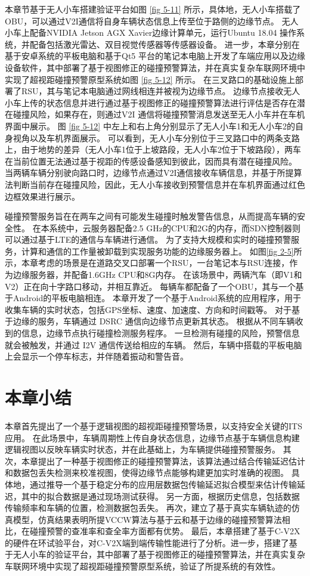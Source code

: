本章节基于无人小车搭建验证平台如图 \ref{fig 5-11} 所示，具体地，无人小车搭载了OBU，可以通过V2I通信将自身车辆状态信息上传至位于路侧的边缘节点。
无人小车上配备NVIDIA Jetson AGX Xavier边缘计算单元，运行Ubuntu 18.04 操作系统，并配备包括激光雷达、双目视觉传感器等传感器设备。
进一步，本章分别在基于安卓系统的平板电脑和基于Qt5 平台的笔记本电脑上开发了车端应用以及边缘设备软件，其中部署了基于视图修正的碰撞预警算法，并在真实复杂车联网环境中实现了超视距碰撞预警原型系统如图 \ref{fig 5-12} 所示。
在三叉路口的基础设施上部署了RSU，其与笔记本电脑通过网线相连并被视为边缘节点。
边缘节点接收无人小车上传的状态信息并进行通过基于视图修正的碰撞预警算法进行评估是否存在潜在碰撞风险，如果存在，则通过V2I 通信将碰撞预警消息发送至无人小车并在车机界面中展示。
图 \ref{fig 5-12} 中左上和右上角分别显示了无人小车1和无人小车2的自身视角以及车机界面展示。
可以看到，无人小车分别位于三叉路口中的两条支路上，由于地势的差异（无人小车1位于上坡路段，无人小车2位于下坡路段），两车在当前位置无法通过基于视距的传感设备感知到彼此，因而具有潜在碰撞风险。
当两辆车辆分别驶向路口时，边缘节点通过V2I通信接收车辆信息，并基于所提算法判断当前存在碰撞风险，因此，无人小车接收到预警信息并在车机界面通过红色边框效果进行展示。

碰撞预警服务旨在在两车之间有可能发生碰撞时触发警告信息，从而提高车辆的安全性。
在本系统中，云服务器配备2.5 GHz的CPU和2G的内存，而SDN控制器则可以通过基于LTE的通信与车辆进行通信。
为了支持大规模和实时的碰撞预警服务，计算和通信的工作量被卸载到实现服务功能的边缘服务器上。
如图\ref{fig 2-5}所示，本章考虑的场景是在道路交叉口部署一个RSU，一台笔记本与RSU连接，作为边缘服务器，并配备1.6GHz CPU和8G内存。
在该场景中，两辆汽车（即V1和V2）正在向十字路口移动，并相互靠近。
每辆车都配备了一个OBU，其与一个基于Android的平板电脑相连。
本章开发了一个基于Android系统的应用程序，用于收集车辆的实时状态，包括GPS坐标、速度、加速度、方向和时间戳等。
对于基于边缘的服务，车辆通过 DSRC 通信向边缘节点更新其状态。
根据从不同车辆收到的信息，边缘节点执行碰撞检测服务程序。
一旦检测有碰撞的风险，预警信息就会被触发，并通过 I2V 通信传送给相应的车辆。
然后，车辆中搭载的平板电脑上会显示一个停车标志，并伴随着振动和警告音。

\section{本章小结}\label{section 5-6}

本章首先提出了一个基于逻辑视图的超视距碰撞预警场景，以支持安全关键的ITS应用。
在此场景中，车辆周期性上传自身状态信息，边缘节点基于车辆信息构建逻辑视图以反映车辆实时状态，并在此基础上，为车辆提供碰撞预警服务。
其次，本章提出了一种基于视图修正的碰撞预警算法，该算法通过结合传输延迟估计和数据包丢失检测来校准视图，使得边缘节点能够构建更加实时准确的视图。
具体地，通过推导一个基于稳定分布的应用层数据包传输延迟拟合模型来估计传输延迟，其中的拟合数据是通过现场测试获得。
另一方面，根据历史信息，包括数据传输频率和车辆的位置，检测数据包丢失。
再次，建立了基于真实车辆轨迹的仿真模型，仿真结果表明所提VCCW算法与基于云和基于边缘的碰撞预警算法相比，在碰撞预警的查准率和查全率方面都有优势。
最后，本章搭建了基于C-V2X的硬件在环试验平台，对C-V2X端到端传输性能进行了分析。进一步，搭建了基于无人小车的验证平台，其中部署了基于视图修正的碰撞预警算法，并在真实复杂车联网环境中实现了超视距碰撞预警原型系统，验证了所提系统的有效性。